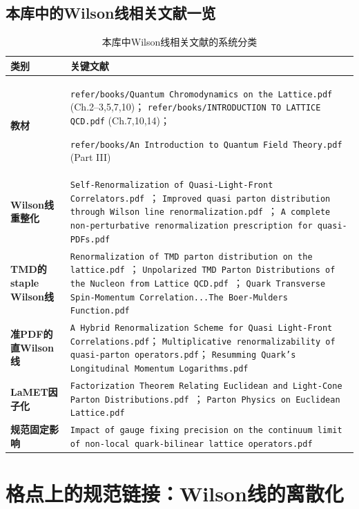 \documentclass[12pt,a4paper]{ctexart}
\theoremstyle{definition}
\begin{document}
\subsection{本库中的Wilson线相关文献一览}

\begin{table}[H]
\centering
\caption{本库中Wilson线相关文献的系统分类}
\label{tab:WL_papers}
\small
\begin{tabular}{lp{7cm}}
\toprule
类别 & 关键文献 \\
\midrule
\textbf{教材} &
\texttt{refer/books/Quantum Chromodynamics on the Lattice.pdf} (Ch.2--3,5,7,10)；
\texttt{refer/books/INTRODUCTION TO LATTICE QCD.pdf} (Ch.7,10,14)；

\texttt{refer/books/An Introduction to Quantum Field Theory.pdf} (Part III) \\
\textbf{Wilson线重整化} &
\texttt{Self-Renormalization of Quasi-Light-Front Correlators.pdf}~\cite{Huo2021self}；
\texttt{Improved quasi parton distribution through Wilson line renormalization.pdf}~\cite{Chen2018WLrenorm}；
\texttt{A complete non-perturbative renormalization prescription for quasi-PDFs.pdf} \\
\textbf{TMD的staple Wilson线} &
\texttt{Renormalization of TMD parton distribution on the lattice.pdf}~\cite{Zhang2022renormTMD}；
\texttt{Unpolarized TMD Parton Distributions of the Nucleon from Lattice QCD.pdf}~\cite{He2024unpolTMD}；
\texttt{Quark Transverse Spin-Momentum Correlation...The Boer-Mulders Function.pdf}~\cite{Ma2025BoerMulders} \\
\textbf{准PDF的直Wilson线} &
\texttt{A Hybrid Renormalization Scheme for Quasi Light-Front Correlations.pdf}；
\texttt{Multiplicative renormalizability of quasi-parton operators.pdf}；
\texttt{Resumming Quark's Longitudinal Momentum Logarithms.pdf} \\
\textbf{LaMET因子化} &
\texttt{Factorization Theorem Relating Euclidean and Light-Cone Parton Distributions.pdf}~\cite{Izubuchi2018}；
\texttt{Parton Physics on Euclidean Lattice.pdf}~\cite{Ji2013Euclidean} \\
\textbf{规范固定影响} &
\texttt{Impact of gauge fixing precision on the continuum limit of non-local quark-bilinear lattice operators.pdf}~\cite{Zhang2024gauge_fixing} \\
\bottomrule
\end{tabular}
\end{table}

\section{格点上的规范链接：Wilson线的离散化}
\end{document}
